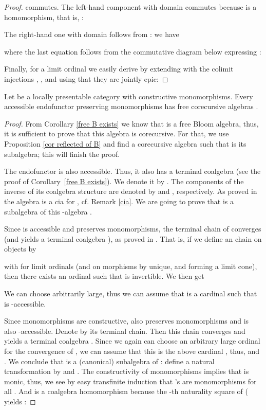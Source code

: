 \documentclass{LMCS}
\theoremstyle{plain}
\theoremstyle{definition}
\numberwithin{equation}{section}
\begin{document}
\begin{defi}
\begin{proof}
commutes. The left-hand component with domain  commutes because  is a homomorphism, that is, :

The right-hand one with domain  follows from : we have

where the last equation follows from the commutative diagram below expressing :

Finally, for a limit ordinal  we easily derive  by extending with the colimit injections , , and using that they are jointly epic: 
\end{proof}

\begin{thm}\label{free cor exists}
Let  be a locally presentable category with constructive monomorphisms. Every accessible endofunctor preserving monomorphisms has free corecursive algebras .
\end{thm}

\begin{proof}
From Corollary \ref{free B exists} we know that  is a free Bloom algebra, thus, it is sufficient to prove that this algebra is corecursive. For that, we use Proposition \ref{cor reflected of B} and find a corecursive algebra such that  is its subalgebra; this will finish the proof.

The endofunctor  is also accessible. Thus, it also has a terminal
coalgebra (see the proof of Corollary~\ref{free B exists}). We denote it by
. The components of the inverse of its coalgebra structure
 are denoted by
 and , respectively. As proved in \cite{m_cia} the algebra  is a cia for , cf. Remark \ref{cia}. We are going to prove that  is a subalgebra of this -algebra .

Since  is accessible and preserves monomorphisms, the terminal chain
of  converges (and yields a terminal coalgebra ), as proved in \cite{at2}. That is, if we define an chain  on objects by

with  for limit ordinals  (and on morphisms by
 unique,  and
 forming a limit cone), then there exists an ordinal
 such that  is invertible. We then get 

We can choose  arbitrarily large, thus we can assume that  is a cardinal such that  is -accessible.

Since monomorphisms are constructive,  also preserves monomorphisms and is also -accessible. Denote by  its terminal chain. Then this chain converges and yields a terminal coalgebra . Since we again can choose an arbitrary large ordinal for the convergence of , we can assume that this is the above cardinal , thus,  and . We conclude that  is a (canonical) subalgebra of : define a natural transformation  by  and . The constructivity of monomorphisms implies that  is monic, thus, we see by easy transfinite induction that 's are monomorphisms for all . And  is a coalgebra homomorphism because the -th naturality square of ( yields :



\end{proof}
\end{defi}
\end{document}

